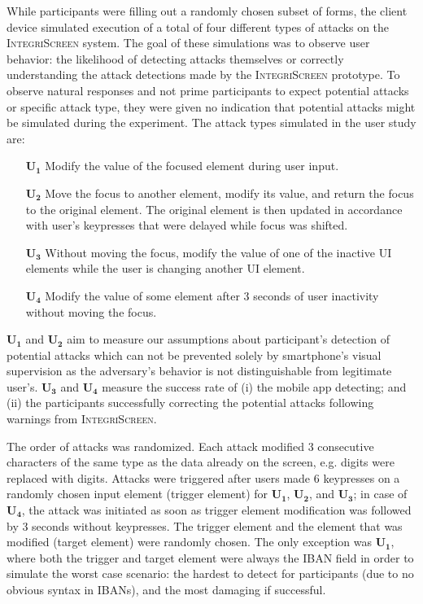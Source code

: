 \documentclass[sigconf, anonymous, balance=false]{acmart}
\newcommand{\myparagraph}[1]{\myparagraphnodot{#1.}}
\newcommand{\myparagraphnodot}[1]{\vspace{4pt} \noindent {\bfseries #1}\xspace}
\newcommand{\atk}[1]{$\mathbf{U_#1}$\xspace}
\newcommand{\sysname}{\textsc{IntegriScreen}\xspace}
\newcommand{\name}{\sysname}
\begin{document}
\myparagraph{Experimental setup} \label{ssec:userStudyAttackEvaluation}
While participants were filling out a randomly chosen subset of forms, the client device simulated execution of a total of four different types of attacks on the \sysname system.
The goal of these simulations was to observe user behavior: the likelihood of detecting attacks themselves or correctly understanding the attack detections made by the \sysname prototype.
To observe natural responses and not prime participants to expect potential attacks or specific attack type, they were given no indication that potential attacks might be simulated during the experiment.
The attack types simulated in the user study are:
\begin{enumerate}%
	\item[\atk{1}] Modify the value of the focused element during user input.
	\item[\atk{2}] Move the focus to another element, modify its value, and return the focus to the original element.
	The original element is then updated in accordance with user's keypresses that were delayed while focus was shifted.
	\item[\atk{3}] Without moving the focus, modify the value of one of the inactive UI elements while the user is changing another UI element.
	\item[\atk{4}] Modify the value of some element after 3 seconds of user inactivity without moving the focus.
\end{enumerate}
\atk{1} and \atk{2} aim to measure our assumptions about participant's detection of potential attacks which can not be prevented solely by smartphone's visual supervision as the adversary's behavior is not distinguishable from legitimate user's.
\atk{3} and \atk{4} measure the success rate of (i) the mobile app detecting; and (ii) the participants successfully correcting the potential attacks following warnings from \name.

The order of attacks was randomized.
Each attack modified 3 consecutive characters of the same type as the data already on the screen, e.g. digits were replaced with digits.
Attacks were triggered after users made 6 keypresses on a randomly chosen input element (trigger element) for \atk{1}, \atk{2}, and \atk{3}; in case of \atk{4}, the attack was initiated as soon as trigger element modification was followed by 3 seconds without keypresses.
The trigger element and the element that was modified (target element) were randomly chosen.
The only exception was \atk{1}, where both the trigger and target element were always the IBAN field in order to simulate the worst case scenario: the hardest to detect for participants (due to no obvious syntax in IBANs), and the most damaging if successful.
\end{document}
